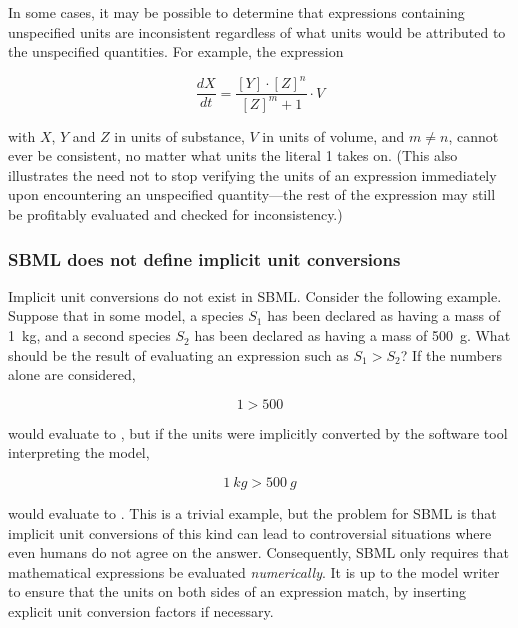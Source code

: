 In some cases, it may be possible to determine that expressions
containing unspecified units are inconsistent regardless of what
units would be attributed to the unspecified quantities.  For
example, the expression
\begin{linenomath}
  \begin{equation*}
    \frac{dX}{dt} = \frac{[Y] \cdot [Z]^n}{[Z]^m + 1} \cdot V
  \end{equation*}
\end{linenomath}
with $X$, $Y$ and $Z$ in units of substance, $V$ in
units of volume, and $m \neq n$, cannot ever be consistent, no
matter what units the literal 1 takes on.  (This also illustrates
the need not to stop verifying the units of an expression
immediately upon encountering an unspecified quantity---the rest
of the expression may still be profitably evaluated and checked
for inconsistency.)


\subsubsection{SBML does not define implicit unit conversions}
\label{sec:no-implicit-conversions}

Implicit unit conversions do not exist in SBML.  Consider the
following example.  Suppose that in some model, a species $S_1$
has been declared as having a mass of 1~kg, and a second species
$S_2$ has been declared as having a mass of 500~g.  What should be
the result of evaluating an expression such as $S_1 > S_2$?  If
the numbers alone are considered,
\begin{linenomath}
  \begin{equation*}
    1 > 500
  \end{equation*}
\end{linenomath}
would evaluate to , but if the units were implicitly
converted by the software tool interpreting the model,
\begin{linenomath}
  \begin{equation*}
    1~kg > 500~g
  \end{equation*}
\end{linenomath}
would evaluate to .  This is a trivial example, but the
problem for SBML is that implicit unit conversions of this kind
can lead to controversial situations where even humans do not
agree on the answer.  Consequently, SBML only requires that
mathematical expressions be evaluated \emph{numerically}.  It is
up to the model writer to ensure that the units on both sides of
an expression match, by inserting explicit unit conversion factors
if necessary.

